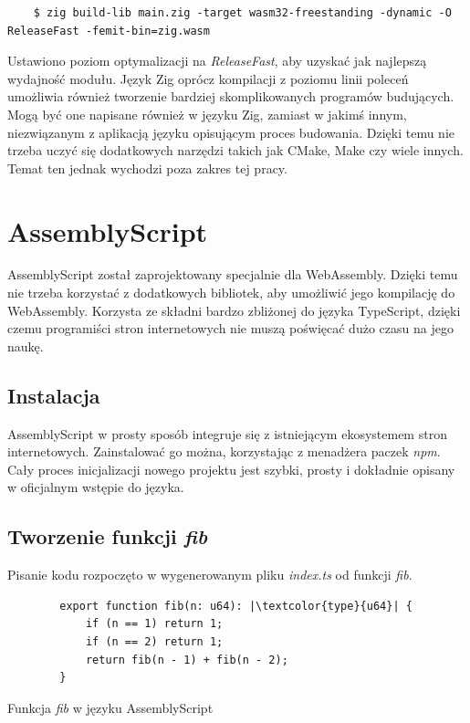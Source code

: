 \documentclass[language=polish,type=master]{aghmodern}
\begin{document}
\begin{verbatim}
    $ zig build-lib main.zig -target wasm32-freestanding -dynamic -O ReleaseFast -femit-bin=zig.wasm
\end{verbatim}

Ustawiono poziom optymalizacji na \emph{ReleaseFast}, aby uzyskać jak najlepszą wydajność modułu.
Język Zig oprócz kompilacji z poziomu linii poleceń umożliwia również tworzenie bardziej skomplikowanych programów budujących.
Mogą być one napisane również w języku Zig, zamiast w jakimś innym, niezwiązanym z aplikacją języku opisującym proces budowania.
Dzięki temu nie trzeba uczyć się dodatkowych narzędzi takich jak CMake, Make czy wiele innych.
Temat ten jednak wychodzi poza zakres tej pracy.

\section{AssemblyScript}
AssemblyScript został zaprojektowany specjalnie dla WebAssembly.
Dzięki temu nie trzeba korzystać z dodatkowych bibliotek, aby umożliwić jego kompilację do WebAssembly.
Korzysta ze składni bardzo zbliżonej do języka TypeScript, dzięki czemu programiści stron internetowych nie muszą poświęcać dużo czasu na jego naukę.

\subsection{Instalacja}
AssemblyScript w prosty sposób integruje się z istniejącym ekosystemem stron internetowych.
Zainstalować go można, korzystając z menadżera paczek \emph{npm}.
Cały proces inicjalizacji nowego projektu jest szybki, prosty i dokładnie opisany w oficjalnym wstępie do języka\footnotemark{}.

\subsection{Tworzenie funkcji \emph{fib}}
Pisanie kodu rozpoczęto w wygenerowanym pliku \emph{index.ts} od funkcji \emph{fib}.

\begin{listing}[H]
    \begin{verbatim}
        export function fib(n: u64): |\textcolor{type}{u64}| {
            if (n == 1) return 1;
            if (n == 2) return 1;
            return fib(n - 1) + fib(n - 2);
        }
    \end{verbatim}
    \caption{Funkcja \emph{fib} w języku AssemblyScript}
\end{listing}
\end{document}
